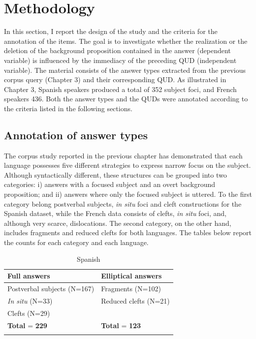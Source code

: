 \section{Methodology}

In this section, I report the design of the study and the criteria for the annotation of the items. The goal is to investigate whether the realization or the deletion of the background proposition contained in the answer (dependent variable) is influenced by the immediacy of the preceding QUD (independent variable). The material consists of the answer types extracted  from the previous corpus query (Chapter 3) and their corresponding QUD. As illustrated in Chapter 3, Spanish speakers produced a total of 352 subject foci, and French speakers 436. 
Both the answer types and the QUDs were annotated according to the criteria listed in the following sections.

\subsection{Annotation of answer types}
The corpus study reported in the previous chapter has demonstrated that each language possesses five different strategies to express narrow focus on the subject. Although syntactically different, these structures can be grouped into two categories: i) answers with a focused subject and an overt background proposition; and ii) answers where only the focused subject is uttered. To the first category belong postverbal subjects, \textit{in situ} foci and cleft constructions for the Spanish dataset, while the French data consists of clefts, \textit{in situ} foci, and, although very scarce, dislocations.
The second category, on the other hand, includes fragments and reduced clefts for both languages. The tables below report the counts for each category and each language. \\

\begin{table}
\caption{Spanish}

\begin{tabularx}{0.8\textwidth} { 
   Q
   >{\arraybackslash} X }
 
 \lsptoprule
 \textbf{Full answers} & \textbf{Elliptical answers}  \\
 \midrule
 Postverbal subjects (N=167)  & Fragments (N=102)  \\
\textit{In situ} (N=33) & Reduced clefts (N=21) \\
Clefts (N=29) & \\
\midrule
\textbf{Total} = \textbf{229} & \textbf{Total} = \textbf{123} \\
\lspbottomrule
\end{tabularx}\\
\end{table}

